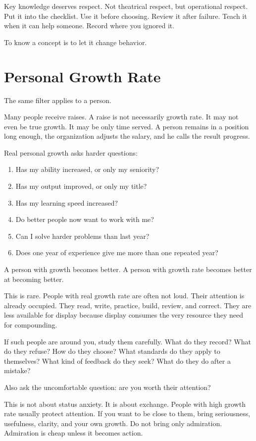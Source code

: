 Key knowledge deserves respect. Not theatrical respect, but operational respect. Put it into the checklist. Use it before choosing. Review it after failure. Teach it when it can help someone. Record where you ignored it.

To know a concept is to let it change behavior.

\section*{Personal Growth Rate}

The same filter applies to a person.

Many people receive raises. A raise is not necessarily growth rate. It may not even be true growth. It may be only time served. A person remains in a position long enough, the organization adjusts the salary, and he calls the result progress.

Real personal growth asks harder questions:

\begin{enumerate}
\item Has my ability increased, or only my seniority?
\item Has my output improved, or only my title?
\item Has my learning speed increased?
\item Do better people now want to work with me?
\item Can I solve harder problems than last year?
\item Does one year of experience give me more than one repeated year?
\end{enumerate}

A person with growth becomes better. A person with growth rate becomes better at becoming better.

This is rare. People with real growth rate are often not loud. Their attention is already occupied. They read, write, practice, build, review, and correct. They are less available for display because display consumes the very resource they need for compounding.

If such people are around you, study them carefully. What do they record? What do they refuse? How do they choose? What standards do they apply to themselves? What kind of feedback do they seek? What do they do after a mistake?

Also ask the uncomfortable question: are you worth their attention?

This is not about status anxiety. It is about exchange. People with high growth rate usually protect attention. If you want to be close to them, bring seriousness, usefulness, clarity, and your own growth. Do not bring only admiration. Admiration is cheap unless it becomes action.

